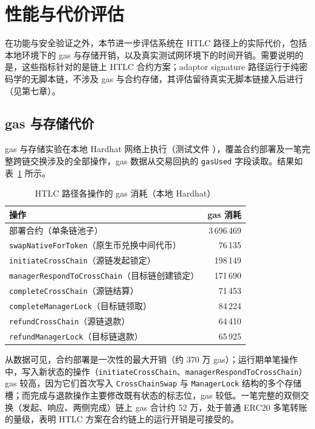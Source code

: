 \section{性能与代价评估}


在功能与安全验证之外，本节进一步评估系统在 HTLC 路径上的实际代价，包括本地环境下的 gas 与存储开销，以及真实测试网环境下的时间开销。需要说明的是，这些指标针对的是链上 HTLC 合约方案；adaptor signature 路径运行于纯密码学的无脚本链，不涉及 gas 与合约存储，其评估留待真实无脚本链接入后进行（见第七章）。

\subsection{gas 与存储代价}


gas 与存储实验在本地 Hardhat 网络上执行（测试文件 ），覆盖合约部署及一笔完整跨链交换涉及的全部操作，gas 数据从交易回执的 \texttt{gasUsed} 字段读取。结果如表~\ref{tab:gas-cost} 所示。

\begin{table}[htbp]
  \centering
  \caption{HTLC 路径各操作的 gas 消耗（本地 Hardhat）}
  \label{tab:gas-cost}
  \begin{tabular}{@{}lr@{}}
    \toprule
    操作 & gas 消耗 \\ \midrule
    部署合约（单条链池子） & 3\,696\,469 \\
    \texttt{swapNativeForToken}（原生币兑换中间代币） & 76\,135 \\
    \texttt{initiateCrossChain}（源链发起锁定） & 198\,149 \\
    \texttt{managerRespondToCrossChain}（目标链创建锁定） & 171\,690 \\
    \texttt{completeCrossChain}（源链结算） & 71\,453 \\
    \texttt{completeManagerLock}（目标链领取） & 84\,224 \\
    \texttt{refundCrossChain}（源链退款） & 64\,410 \\
    \texttt{refundManagerLock}（目标链退款） & 65\,925 \\
    \bottomrule
  \end{tabular}
\end{table}

从数据可见，合约部署是一次性的最大开销（约 370 万 gas）；运行期单笔操作中，写入新状态的操作（\texttt{initiateCrossChain}、\texttt{managerRespondToCrossChain}）gas 较高，因为它们首次写入 \texttt{CrossChainSwap} 与 \texttt{ManagerLock} 结构的多个存储槽；而完成与退款操作主要修改既有状态的标志位，gas 较低。一笔完整的双侧交换（发起、响应、两侧完成）链上 gas 合计约 52 万，处于普通 ERC20 多笔转账的量级，表明 HTLC 方案在合约链上的运行开销是可接受的。

